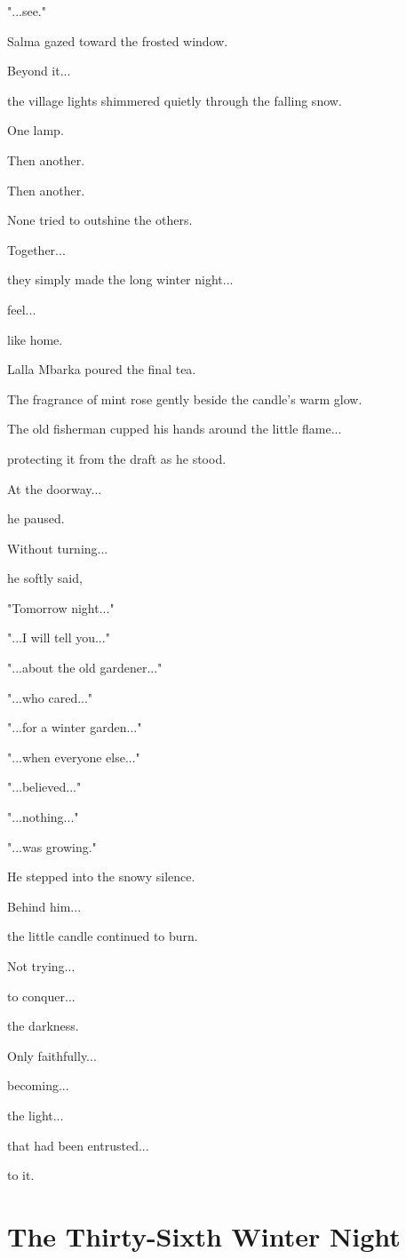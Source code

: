 \documentclass[12pt,openany]{book}
\begin{document}
"...see."

Salma gazed toward the frosted window.

Beyond it...

the village lights shimmered quietly through the falling snow.

One lamp.

Then another.

Then another.

None tried to outshine the others.

Together...

they simply made the long winter night...

feel...

like home.

Lalla Mbarka poured the final tea.

The fragrance of mint rose gently beside the candle's warm glow.

The old fisherman cupped his hands around the little flame...

protecting it from the draft as he stood.

At the doorway...

he paused.

Without turning...

he softly said,

"Tomorrow night..."

"...I will tell you..."

"...about the old gardener..."

"...who cared..."

"...for a winter garden..."

"...when everyone else..."

"...believed..."

"...nothing..."

"...was growing."

He stepped into the snowy silence.

Behind him...

the little candle continued to burn.

Not trying...

to conquer...

the darkness.

Only faithfully...

becoming...

the light...

that had been entrusted...

to it.
\chapter{The Thirty-Sixth Winter Night}
\end{document}
